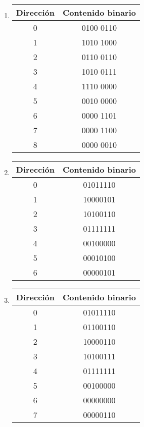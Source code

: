 \documentclass[12pt]{article}
\begin{document}
\begin{enumerate}
\item \begin{tabular}{| c | c |}
        \hline
        \textbf{Dirección}&\textbf{Contenido binario}\\
        \hline \hline
        0 & 0100 0110\\ \hline
        1 & 1010 1000\\ \hline
        2 & 0110 0110\\ \hline
        3 & 1010 0111\\ \hline
        4 & 1110 0000\\ \hline
        5 & 0010 0000\\ \hline
        6 & 0000 1101\\ \hline
        7 & 0000 1100\\ \hline
        8 & 0000 0010\\ \hline
\end{tabular}

\item \begin{tabular}{| c | c |}
        \hline
        \textbf{Dirección}&\textbf{Contenido binario}\\
        \hline \hline
        0 & 01011110\\ \hline
        1 & 10000101\\ \hline
        2 & 10100110\\ \hline
        3 & 01111111\\ \hline
        4 & 00100000\\ \hline
        5 & 00010100\\ \hline
        6 & 00000101\\ \hline
\end{tabular}

\item \begin{tabular}{| c | c |}
        \hline
        \textbf{Dirección}&\textbf{Contenido binario}\\
        \hline \hline
        0 & 01011110\\ \hline
        1 & 01100110\\ \hline
        2 & 10000110\\ \hline
        3 & 10100111\\ \hline
        4 & 01111111\\ \hline
        5 & 00100000\\ \hline
        6 & 00000000\\ \hline
        7 & 00000110\\ \hline
\end{tabular}


\end{enumerate}
\end{document}
